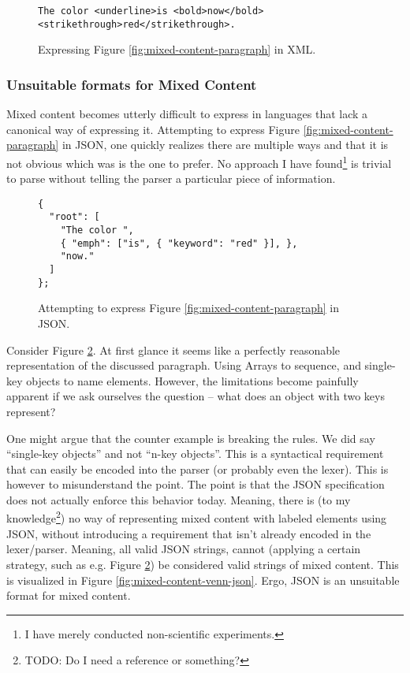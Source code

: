 \documentclass{scrreprt}
\begin{document}
\begin{figure}[h]
\begin{lstlisting}
The color <underline>is <bold>now</bold> <strikethrough>red</strikethrough>.
\end{lstlisting}
\caption{Expressing Figure \ref{fig:mixed-content-paragraph} in XML.}
\label{fig:mixed-content-xml}
\end{figure}



\subsubsection{Unsuitable formats for Mixed Content}
Mixed content becomes utterly difficult to express in languages that lack a canonical way of expressing it. Attempting to express Figure \ref{fig:mixed-content-paragraph} in JSON, one quickly realizes there are multiple ways and that it is not obvious which was is the one to prefer. No approach I have found\footnote{I have merely conducted non-scientific experiments.} is trivial to parse without telling the parser a particular piece of information.

\begin{figure}[h]
\begin{lstlisting}
{
  "root": [
    "The color ",
    { "emph": ["is", { "keyword": "red" }], },
    "now."
  ]
};
\end{lstlisting}
\caption{Attempting to express Figure \ref{fig:mixed-content-paragraph} in JSON.}
\label{fig:mixed-content-json}
\end{figure}


Consider Figure \ref{fig:mixed-content-json}. At first glance it seems like a perfectly reasonable representation of the discussed paragraph. Using Arrays to sequence, and single-key objects to name elements. However, the limitations become painfully apparent if we ask ourselves the question -- what does an object with two keys represent?

One might argue that the counter example is breaking the rules. We did say ``single-key objects'' and not ``n-key objects''. This is a syntactical requirement that can easily be encoded into the parser (or probably even the lexer). This is however to misunderstand the point. The point is that the JSON specification does not actually enforce this behavior today. Meaning, there is (to my knowledge\footnote{TODO: Do I need a reference or something?}) no way of representing mixed content with labeled elements using JSON, without introducing a requirement that isn't already encoded in the lexer/parser. Meaning, all valid JSON strings, cannot (applying a certain strategy, such as e.g. Figure \ref{fig:mixed-content-json}) be considered valid strings of mixed content. This is visualized in Figure \ref{fig:mixed-content-venn-json}. Ergo, JSON is an unsuitable format for mixed content.
\end{document}
